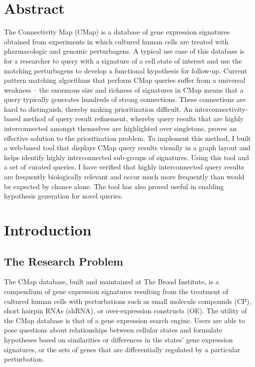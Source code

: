 \documentclass[12pt]{article}
\begin{document}
\doublespacing

\section{Abstract}
The Connectivity Map (CMap) is a database of gene expression signatures obtained from experiments in which cultured human cells are treated with pharmacologic and genomic perturbagens. A typical use case of this database is for a researcher to query with a signature of a cell state of interest and use the matching perturbagens to develop a functional hypothesis for follow-up. Current pattern matching algorithms that perform CMap queries suffer from a universal weakness -- the enormous size and richness of signatures in CMap means that a query typically generates hundreds of strong connections. These connections are hard to distinguish, thereby making prioritization difficult. An interconnectivity-based method of query result refinement, whereby query results that are highly interconnected amongst themselves are highlighted over singletons, proves an effective solution to the prioritization problem. To implement this method, I built a web-based tool that displays CMap query results visually in a graph layout and helps identify highly interconnected sub-groups of signatures. Using this tool and a set of curated queries, I have verified that highly interconnected query results are frequently biologically relevant and occur much more frequently than would be expected by chance alone. The tool has also proved useful in enabling hypothesis generation for novel queries.

\newpage
\mbox{}

\tableofcontents


\listoffigures

\section{Introduction}

\subsection{The Research Problem}

The CMap database, built and maintained at The Broad Institute, is a compendium of gene expression signatures resulting from the treatment of cultured human cells with perturbations such as small molecule compounds (CP), short hairpin RNAs (shRNA), or over-expression constructs (OE). The utility of the CMap database is that of a gene expression search engine. Users are able to pose questions about relationships between cellular states and formulate hypotheses based on similarities or differences in the states' gene expression signatures, or the sets of genes that are differentially regulated by a particular perturbation.
\end{document}
